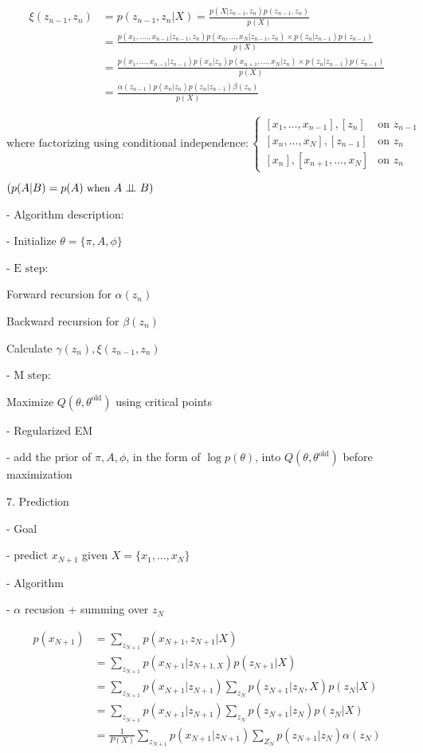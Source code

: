        \begin{align} \displaystyle \xi(z_{n-1}, z_n) &= p(z_{n-1},z_n|X) = \frac{p(X|z_{n-1},z_n)p(z_{n-1},z_n)}{p(X)} \\ &= \frac{p(x_1,....,x_{n-1}| z_{n-1},z_n) p(x_n,...,x_N|z_{n-1} ,z_n) \times p(z_n|z_{n-1})p(z_{n-1})} {p(X)} \\ &= \frac{p(x_1,...,x_{n-1}|z_{n-1}) p(x_n|z_n)p(x_{n+1},...,x_N|z_n) \times p(z_n|z_{n-1})p(z_{n-1})} {p(X)} \\ &= \frac {\alpha(z_{n-1})p(x_n|z_n)p(z_n|z_{n-1})\beta(z_n)} {p(X)} \end{align}

       $\text{where factorizing using conditional independence}: \begin{cases} [x_1,...,x_{n-1}],[z_n] &\text{on } z_{n-1} \\ [x_n,...,x_N],[z_{n-1}] &\text{on } z_n  \\ [x_n],[x_{n+1},...,x_N] &\text{on } z_n \end{cases}$ 

       $\small (p(A|B)=p(A) \text{ when } A\perp\!\!\!\perp B) $ 

   - Algorithm description:

     - Initialize $\theta = \{ \pi,A,\phi \}$ 

     - $\text{E step:}$ 

       Forward recursion for $\alpha(z_n)$ 

       Backward recursion for $\beta(z_n)$ 

       Calculate $\gamma(z_n), \xi(z_{n-1}, z_n)$ 

     - $\text{M step:}$ 

       Maximize $Q(\theta,\theta^{\text{old}})$ using critical points

   - Regularized EM

     - add the prior of $\pi, A, \phi$, in the form of $\log p(\theta)$, into $Q(\theta,\theta^\text{old})$ before maximization

7. Prediction

   - Goal

     - predict $x_{N+1}$ given $X=\{x_1,...,x_N\}$ 

   - Algorithm

     - $\alpha$ recusion + summing over $z_N$

       \begin{align} \displaystyle p(x_{N+1}) &= \sum_{z_{N+1}} p(x_{N+1}, z_{N+1}|X) \\ &= \sum_{z_{N+1}} p(x_{N+1}|z_{N+1,X})p(z_{N+1}|X) \\ &= \sum_{z_{N+1}} p(x_{N+1} | z_{N+1}) \sum_{z_N} p(z_{N+1}|z_N,X)p(z_N|X) \\ &= \sum_{z_{N+1}} p(x_{N+1}|z_{N+1}) \sum_{z_N} p(z_{N+1}|z_N)p(z_N|X) \\ &= \frac 1 {P(X)}\sum_{z_{N+1}} p(x_{N+1}| z_{N+1}) \sum_{Z_{N}} p(z_{N+1}|z_N) \alpha(z_N) \end{align}

